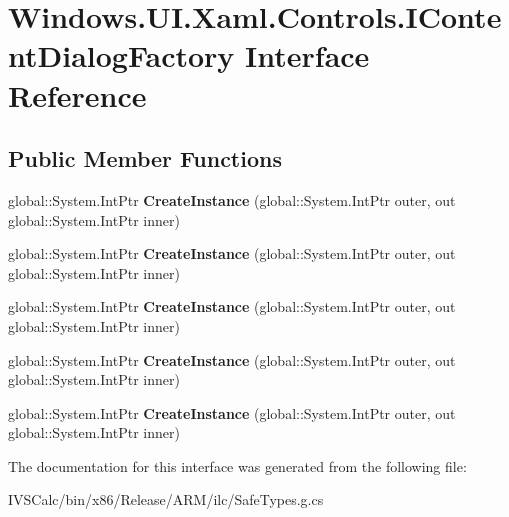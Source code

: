 \hypertarget{interface_windows_1_1_u_i_1_1_xaml_1_1_controls_1_1_i_content_dialog_factory}{}\section{Windows.\+U\+I.\+Xaml.\+Controls.\+I\+Content\+Dialog\+Factory Interface Reference}
\label{interface_windows_1_1_u_i_1_1_xaml_1_1_controls_1_1_i_content_dialog_factory}
\subsection*{Public Member Functions}
\begin{DoxyCompactItemize}
\item 
\mbox{\label{interface_windows_1_1_u_i_1_1_xaml_1_1_controls_1_1_i_content_dialog_factory_a21e7156ce63c6c74cb6f53c64e39e0bd}} 
global\+::\+System.\+Int\+Ptr {\bfseries Create\+Instance} (global\+::\+System.\+Int\+Ptr outer, out global\+::\+System.\+Int\+Ptr inner)
\item 
\mbox{\label{interface_windows_1_1_u_i_1_1_xaml_1_1_controls_1_1_i_content_dialog_factory_a21e7156ce63c6c74cb6f53c64e39e0bd}} 
global\+::\+System.\+Int\+Ptr {\bfseries Create\+Instance} (global\+::\+System.\+Int\+Ptr outer, out global\+::\+System.\+Int\+Ptr inner)
\item 
\mbox{\label{interface_windows_1_1_u_i_1_1_xaml_1_1_controls_1_1_i_content_dialog_factory_a21e7156ce63c6c74cb6f53c64e39e0bd}} 
global\+::\+System.\+Int\+Ptr {\bfseries Create\+Instance} (global\+::\+System.\+Int\+Ptr outer, out global\+::\+System.\+Int\+Ptr inner)
\item 
\mbox{\label{interface_windows_1_1_u_i_1_1_xaml_1_1_controls_1_1_i_content_dialog_factory_a21e7156ce63c6c74cb6f53c64e39e0bd}} 
global\+::\+System.\+Int\+Ptr {\bfseries Create\+Instance} (global\+::\+System.\+Int\+Ptr outer, out global\+::\+System.\+Int\+Ptr inner)
\item 
\mbox{\label{interface_windows_1_1_u_i_1_1_xaml_1_1_controls_1_1_i_content_dialog_factory_a21e7156ce63c6c74cb6f53c64e39e0bd}} 
global\+::\+System.\+Int\+Ptr {\bfseries Create\+Instance} (global\+::\+System.\+Int\+Ptr outer, out global\+::\+System.\+Int\+Ptr inner)
\end{DoxyCompactItemize}


The documentation for this interface was generated from the following file\+:\begin{DoxyCompactItemize}
\item 
I\+V\+S\+Calc/bin/x86/\+Release/\+A\+R\+M/ilc/Safe\+Types.\+g.\+cs\end{DoxyCompactItemize}
